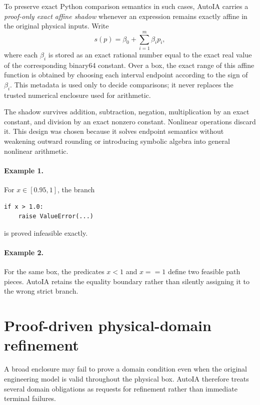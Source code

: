 \documentclass[11pt]{article}
\begin{document}
To preserve exact Python comparison semantics in such cases, AutoIA carries a
\emph{proof-only exact affine shadow} whenever an expression remains exactly
affine in the original physical inputs.  Write
\[
  s(p)=\beta_0+\sum_{i=1}^m\beta_i p_i,
\]
where each \(\beta_i\) is stored as an exact rational number equal to the exact
real value of the corresponding binary64 constant.  Over a box, the exact range
of this affine function is obtained by choosing each interval endpoint according
to the sign of \(\beta_i\).  This metadata is used only to decide comparisons;
it never replaces the trusted numerical enclosure used for arithmetic.

The shadow survives addition, subtraction, negation, multiplication by an exact
constant, and division by an exact nonzero constant.  Nonlinear operations
discard it.  This design was chosen because it solves endpoint semantics without
weakening outward rounding or introducing symbolic algebra into general
nonlinear arithmetic.

\paragraph{Example 1.}
For \(x\in[0.95,1]\), the branch
\begin{verbatim}
if x > 1.0:
    raise ValueError(...)
\end{verbatim}
is proved infeasible exactly.

\paragraph{Example 2.}
For the same box, the predicates \(x<1\) and \(x==1\) define two feasible path
pieces.  AutoIA retains the equality boundary rather than silently assigning it
to the wrong strict branch.

\section{Proof-driven physical-domain refinement}

A broad enclosure may fail to prove a domain condition even when the original
engineering model is valid throughout the physical box.  AutoIA therefore treats
several domain obligations as requests for refinement rather than immediate
terminal failures.
\end{document}
